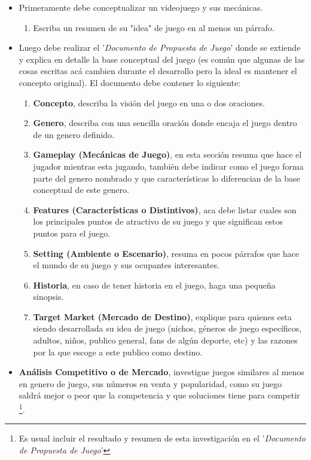 \begin{itemize}
\item Primeramente debe conceptualizar un videojuego y sus mecánicas.
\begin{enumerate}
  \item Escriba un resumen de su "idea" de juego en al menos un párrafo.
\end{enumerate}
\item Luego debe realizar el '\emph{Documento de Propuesta de Juego}' donde se extiende y explica en detalle la base conceptual del juego (es común que algunas de las cosas escritas acá cambien durante el desarrollo pero la ideal es mantener el concepto original). El documento debe contener lo siguiente:
\begin{enumerate}
  \item \textbf{Concepto}, describa la visión del juego en una o dos oraciones.
  \item \textbf{Genero}, describa con una sencilla oración donde encaja el juego dentro de un genero definido.
  \item \textbf{Gameplay (Mecánicas de Juego)}, en esta sección resuma que hace el jugador mientras esta jugando, también debe indicar como el juego forma parte del genero nombrado y que características lo diferencian de la base conceptual de este genero.
  \item \textbf{Features (Características o Distintivos)}, aca debe listar cuales son los principales puntos de atractivo de su juego y que significan estos puntos para el juego.
  \item \textbf{Setting (Ambiente o Escenario)}, resuma en pocos párrafos que hace el mundo de su juego y sus ocupantes interesantes.
  \item \textbf{Historia}, en caso de tener historia en el juego, haga una pequeña sinopsis.
  \item \textbf{Target Market (Mercado de Destino)}, explique para quienes esta siendo desarrollada su idea de juego (nichos, géneros de juego específicos, adultos, niños, publico general, fans de algún deporte, etc) y las razones por la que escoge a este publico como destino.
\end{enumerate}
\item \textbf{Análisis Competitivo o de Mercado}, investigue juegos similares al menos en genero de juego, sus números en venta y popularidad, como su juego saldrá mejor o peor que la competencia y que soluciones tiene para competir \footnote{Es usual incluir el resultado y resumen de esta investigación en el '\emph{Documento de Propuesta de Juego}'}.

\end{itemize}
